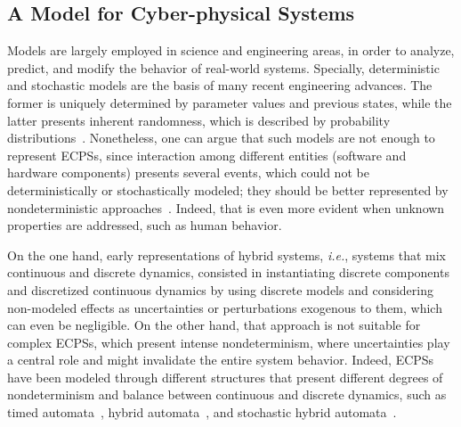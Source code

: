 \documentclass[format=acmsmall, review=false, screen=true]{acmart}
\begin{document}
\subsection{A Model for Cyber-physical Systems}
\label{ssec:model}

Models are largely employed in science and engineering areas, in order to analyze, predict, and modify the behavior of real-world systems. Specially, deterministic and stochastic models are the basis of many recent engineering advances. The former is uniquely determined by parameter values and previous states, while the latter presents inherent randomness, which is described by probability distributions~\cite{stochmodel}. Nonetheless, one can argue that such models are not enough to represent ECPSs, since interaction among different entities (software and hardware components) presents several events, which could not be deterministically or stochastically modeled; they should be better represented by nondeterministic approaches~\cite{leeCPS2}. Indeed, that is even more evident when unknown properties are addressed, such as human behavior.

On the one hand, early representations of hybrid systems, {\it i.e.}, systems that mix continuous and discrete dynamics, consisted in instantiating discrete components and discretized continuous dynamics by using discrete models and considering non-modeled effects as uncertainties or perturbations exogenous to them, which can even be negligible. On the other hand, that approach is not suitable for complex ECPSs, which present intense nondeterminism, where uncertainties play a central role and might invalidate the entire system behavior. Indeed, ECPSs have been modeled through different structures that present different degrees of nondeterminism and balance between continuous and discrete dynamics, such as timed automata~\cite{Alur94}, hybrid automata~\cite{Alur93,Henzinger95}, and stochastic hybrid automata~\cite{Julius09,Ghosh05,Pola03}.
\end{document}
